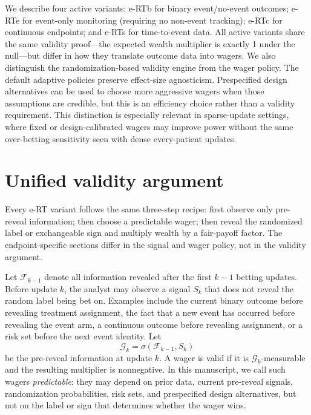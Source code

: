 \documentclass[10pt]{article}
\begin{document}
We describe four active variants: e-RTb for binary event/no-event outcomes; e-RTe for event-only monitoring (requiring no non-event tracking); e-RTc for continuous endpoints; and e-RTs for time-to-event data. All active variants share the same validity proof---the expected wealth multiplier is exactly 1 under the null---but differ in how they translate outcome data into wagers. We also distinguish the randomization-based validity engine from the wager policy. The default adaptive policies preserve effect-size agnosticism. Prespecified design alternatives can be used to choose more aggressive wagers when those assumptions are credible, but this is an efficiency choice rather than a validity requirement. This distinction is especially relevant in sparse-update settings, where fixed or design-calibrated wagers may improve power without the same over-betting sensitivity seen with dense every-patient updates.

\section{Unified validity argument}

Every e-RT variant follows the same three-step recipe: first observe only pre-reveal information; then choose a predictable wager; then reveal the randomized label or exchangeable sign and multiply wealth by a fair-payoff factor. The endpoint-specific sections differ in the signal and wager policy, not in the validity argument.

Let $\mathcal{F}_{k-1}$ denote all information revealed after the first $k-1$ betting updates. Before update $k$, the analyst may observe a signal $S_k$ that does not reveal the random label being bet on. Examples include the current binary outcome before revealing treatment assignment, the fact that a new event has occurred before revealing the event arm, a continuous outcome before revealing assignment, or a risk set before the next event identity. Let
\begin{equation}
\mathcal{G}_k = \sigma(\mathcal{F}_{k-1}, S_k)
\end{equation}
be the pre-reveal information at update $k$. A wager is valid if it is $\mathcal{G}_k$-measurable and the resulting multiplier is nonnegative. In this manuscript, we call such wagers \emph{predictable}: they may depend on prior data, current pre-reveal signals, randomization probabilities, risk sets, and prespecified design alternatives, but not on the label or sign that determines whether the wager wins.
\end{document}
